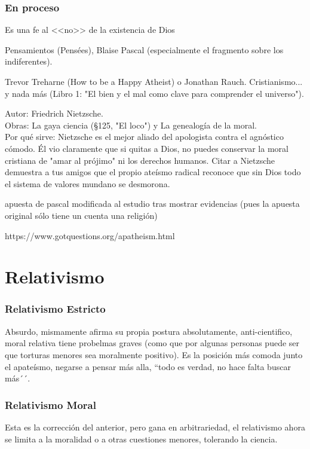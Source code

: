 \documentclass[12pt]{report}
\begin{document}
	
	\subsubsection{En proceso}
		
	Es una fe al <<no>> de la existencia de Dios
	
	Pensamientos (Pensées), Blaise Pascal (especialmente el fragmento sobre los indiferentes).
	
	Trevor Treharne (How to be a Happy Atheist) o Jonathan Rauch.
	Cristianismo... y nada más (Libro 1: "El bien y el mal como clave para comprender el universo").
	
	Autor: Friedrich Nietzsche.\\
	Obras: La gaya ciencia (§125, "El loco") y La genealogía de la moral.\\
	Por qué sirve: Nietzsche es el mejor aliado del apologista contra el agnóstico cómodo. Él vio claramente que si quitas a Dios, no puedes conservar la moral cristiana de "amar al prójimo" ni los derechos humanos. Citar a Nietzsche demuestra a tus amigos que el propio ateísmo radical reconoce que sin Dios todo el sistema de valores mundano se desmorona.
	
	apuesta de pascal modificada al estudio tras mostrar evidencias (pues la apuesta original sólo tiene un cuenta una religión)
	
	\begin{minibloque}[Fuentes]
		https://www.gotquestions.org/apatheism.html
	\end{minibloque}
	
	\section{Relativismo}
	\subsubsection{Relativismo Estricto}
	Absurdo, mismamente afirma su propia postura absolutamente, anti-cientifico, moral relativa tiene probelmas graves (como que por algunas personas puede ser que torturas menores sea moralmente positivo). Es la posición más comoda junto el apateísmo, negarse a pensar más alla, ``todo es verdad, no hace falta buscar más´´.

	\subsubsection{Relativismo Moral}
	Esta es la corrección del anterior, pero gana en arbitrariedad, el relativismo ahora se limita a la moralidad o a otras cuestiones menores, tolerando la ciencia.
	
\end{document}
